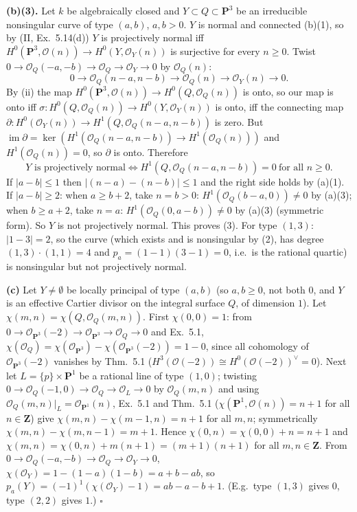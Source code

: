 \documentclass[11pt]{article}
\begin{document}
\textbf{(b)(3).} Let $k$ be algebraically closed and $Y\subset Q\subset\mathbf P^3$ be an irreducible nonsingular curve of type $(a,b)$, $a,b>0$. $Y$ is normal and connected (b)(1), so by (II, Ex.~5.14(d)) $Y$ is projectively normal iff $H^0(\mathbf P^3,\mathcal O(n))\to H^0(Y,\mathcal O_Y(n))$ is surjective for every $n\ge0$. Twist $0\to\mathcal O_Q(-a,-b)\to\mathcal O_Q\to\mathcal O_Y\to0$ by $\mathcal O_Q(n)$:
\[
0\to\mathcal O_Q(n-a,n-b)\to\mathcal O_Q(n)\to\mathcal O_Y(n)\to0.
\]
By (ii) the map $H^0(\mathbf P^3,\mathcal O(n))\to H^0(Q,\mathcal O_Q(n))$ is onto, so our map is onto iff $\sigma\colon H^0(Q,\mathcal O_Q(n))\to H^0(Y,\mathcal O_Y(n))$ is onto, iff the connecting map $\partial\colon H^0(\mathcal O_Y(n))\to H^1(Q,\mathcal O_Q(n-a,n-b))$ is zero. But $\operatorname{im}\partial=\ker(H^1(\mathcal O_Q(n-a,n-b))\to H^1(\mathcal O_Q(n)))$ and $H^1(\mathcal O_Q(n))=0$, so $\partial$ is onto. Therefore
\[
Y\text{ is projectively normal}\iff H^1(Q,\mathcal O_Q(n-a,n-b))=0\ \text{for all }n\ge0.
\]
If $|a-b|\le1$ then $|(n-a)-(n-b)|\le1$ and the right side holds by (a)(1). If $|a-b|\ge2$: when $a\ge b+2$, take $n=b>0$: $H^1(\mathcal O_Q(b-a,0))\ne0$ by (a)(3); when $b\ge a+2$, take $n=a$: $H^1(\mathcal O_Q(0,a-b))\ne0$ by (a)(3) (symmetric form). So $Y$ is not projectively normal. This proves (3). For type $(1,3)$: $|1-3|=2$, so the curve (which exists and is nonsingular by (2), has degree $(1,3)\cdot(1,1)=4$ and $p_a=(1-1)(3-1)=0$, i.e.\ is the rational quartic) is nonsingular but not projectively normal.

\textbf{(c)} Let $Y\ne\emptyset$ be locally principal of type $(a,b)$ (so $a,b\ge0$, not both $0$, and $Y$ is an effective Cartier divisor on the integral surface $Q$, of dimension $1$). Let $\chi(m,n)=\chi(Q,\mathcal O_Q(m,n))$. First $\chi(0,0)=1$: from $0\to\mathcal O_{\mathbf P^3}(-2)\to\mathcal O_{\mathbf P^3}\to\mathcal O_Q\to0$ and Ex.~5.1, $\chi(\mathcal O_Q)=\chi(\mathcal O_{\mathbf P^3})-\chi(\mathcal O_{\mathbf P^3}(-2))=1-0$, since all cohomology of $\mathcal O_{\mathbf P^3}(-2)$ vanishes by Thm.~5.1 ($H^3(\mathcal O(-2))\cong H^0(\mathcal O(-2))^\vee=0$). Next let $L=\{p\}\times\mathbf P^1$ be a rational line of type $(1,0)$; twisting $0\to\mathcal O_Q(-1,0)\to\mathcal O_Q\to\mathcal O_L\to0$ by $\mathcal O_Q(m,n)$ and using $\mathcal O_Q(m,n)|_L=\mathcal O_{\mathbf P^1}(n)$, Ex.~5.1 and Thm.~5.1 ($\chi(\mathbf P^1,\mathcal O(n))=n+1$ for all $n\in\mathbf Z$) give $\chi(m,n)-\chi(m-1,n)=n+1$ for all $m,n$; symmetrically $\chi(m,n)-\chi(m,n-1)=m+1$. Hence $\chi(0,n)=\chi(0,0)+n=n+1$ and $\chi(m,n)=\chi(0,n)+m(n+1)=(m+1)(n+1)$ for all $m,n\in\mathbf Z$. From $0\to\mathcal O_Q(-a,-b)\to\mathcal O_Q\to\mathcal O_Y\to0$, $\chi(\mathcal O_Y)=1-(1-a)(1-b)=a+b-ab$, so $p_a(Y)=(-1)^1(\chi(\mathcal O_Y)-1)=ab-a-b+1$. (E.g.\ type $(1,3)$ gives $0$, type $(2,2)$ gives $1$.) \hfill$\square$
\end{document}
